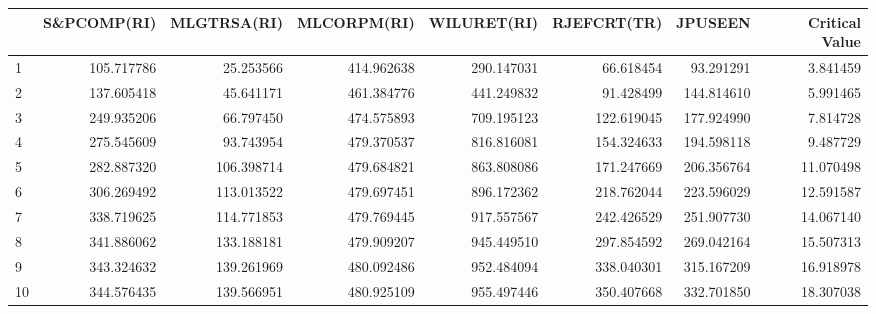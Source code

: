 \begin{tabular}{lrrrrrrr}
\toprule
{} &  S\&PCOMP(RI) &  MLGTRSA(RI) &  MLCORPM(RI) &  WILURET(RI) &  RJEFCRT(TR) &     JPUSEEN &  Critical Value \\
\midrule
1  &   105.717786 &    25.253566 &   414.962638 &   290.147031 &    66.618454 &   93.291291 &        3.841459 \\
2  &   137.605418 &    45.641171 &   461.384776 &   441.249832 &    91.428499 &  144.814610 &        5.991465 \\
3  &   249.935206 &    66.797450 &   474.575893 &   709.195123 &   122.619045 &  177.924990 &        7.814728 \\
4  &   275.545609 &    93.743954 &   479.370537 &   816.816081 &   154.324633 &  194.598118 &        9.487729 \\
5  &   282.887320 &   106.398714 &   479.684821 &   863.808086 &   171.247669 &  206.356764 &       11.070498 \\
6  &   306.269492 &   113.013522 &   479.697451 &   896.172362 &   218.762044 &  223.596029 &       12.591587 \\
7  &   338.719625 &   114.771853 &   479.769445 &   917.557567 &   242.426529 &  251.907730 &       14.067140 \\
8  &   341.886062 &   133.188181 &   479.909207 &   945.449510 &   297.854592 &  269.042164 &       15.507313 \\
9  &   343.324632 &   139.261969 &   480.092486 &   952.484094 &   338.040301 &  315.167209 &       16.918978 \\
10 &   344.576435 &   139.566951 &   480.925109 &   955.497446 &   350.407668 &  332.701850 &       18.307038 \\
\bottomrule
\end{tabular}
